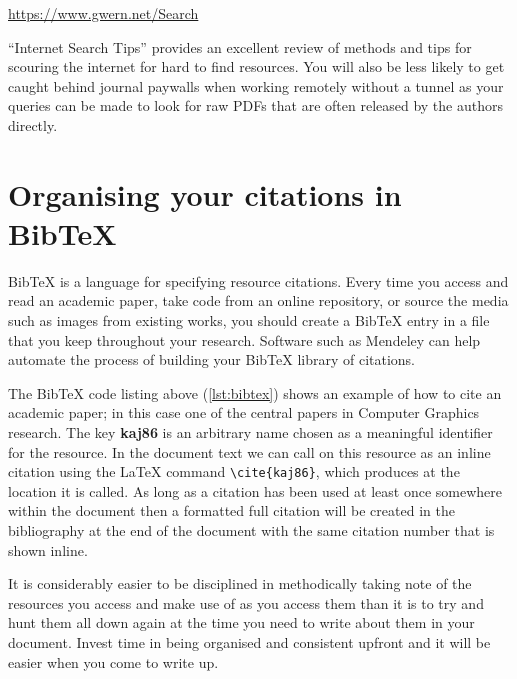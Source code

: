 		\begin{center}
		{\small \url{https://www.gwern.net/Search}}
		\end{center}
		
``Internet Search Tips'' \cite{gwern} provides an excellent review of methods and tips for scouring the internet for hard to find resources.
You will also be less likely to get caught behind journal paywalls when working remotely without a tunnel as your queries can be made to look for raw PDFs that are often released by the authors directly.


	\section{Organising your citations in Bib\TeX{}}
		\label{sec:resources_bibtex}
	
Bib\TeX{} is a language for specifying resource citations.
Every time you access and read an academic paper, take code from an online repository, or source the media such as images from existing works, you should create a Bib\TeX{} entry in a file that you keep throughout your research.
Software such as Mendeley \cite{mendeley} can help automate the process of building your Bib\TeX{} library of citations. 
		
		
		
The Bib\TeX{} code listing above (\cref{lst:bibtex}) shows an example of how to cite an academic paper; in this case one of the central papers in Computer Graphics research.
The key \textbf{kaj86} is an arbitrary name chosen as a meaningful identifier for the resource.
In the document text we can call on this resource as an inline citation using the \LaTeX{} command \lstinline|\cite{kaj86}|, which produces \cite{kaj86} at the location it is called.
As long as a citation has been used at least once somewhere within the document then a formatted full citation will be created in the bibliography at the end of the document with the same citation number that is shown inline.
		
It is considerably easier to be disciplined in methodically taking note of the resources you access and make use of as you access them than it is to try and hunt them all down again at the time you need to write about them in your document.
Invest time in being organised and consistent upfront and it will be easier when you come to write up.



